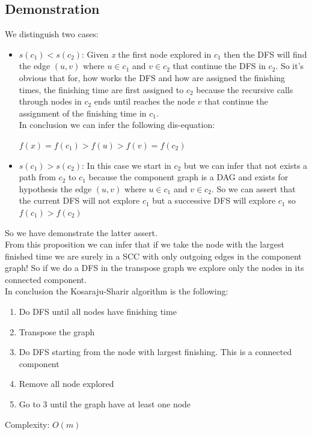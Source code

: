 \documentclass[10pt,a4paper]{book}
\begin{document}
			\subsection{Demonstration}
			We distinguish two cases:
			\begin{itemize}
				\item $ s(c_1) < s(c_2) $: Given \textit{x} the first node explored in $ c_1  $ then the DFS will find the edge $ (u,v) $ where $ u \in c_1 $ and $ v \in c_2 $ that continue the DFS in $ c_2 $. So it's obvious that for, how works the DFS and how are assigned the finishing times, the finishing time are first assigned to $ c_2 $ because the recursive calls through nodes in $ c_2 $ ends until reaches the node $ v $ that continue the assignment of the finishing time in $ c_1 $.\\
				In conclusion we can infer the following dis-equation:
				\begin{center}
				$ f(x) = f(c_1) > f(u) > f(v)  = f(c_2) $
				\end{center}
				\item $ s(c_1) > s(c_2) $: In this case we start in $ c_2 $ but we can infer that not exists a path  from $c_2$ to $ c_1 $ because the component graph is a DAG and exists for hypothesis the edge $ (u,v) $ where $ u \in c_1 $ and $ v \in c_2 $. So we can assert that the current DFS will not explore $ c_1 $ but a successive DFS will explore $ c_1 $ so $ f(c_1) > f(c_2) $
			\end{itemize}
			So we have demonstrate the latter assert.\\
		 From this proposition we can infer that if we take the node with the largest finished time we are surely in a SCC with only outgoing edges in the component graph! So if we do a DFS in the transpose graph we explore only the nodes in its connected component.\\
		 In conclusion the Kosaraju-Sharir algorithm is the following:
		 \begin{enumerate}
			 	\item Do DFS until all nodes have finishing time
			 	\item Transpose the graph
			 	\item Do DFS starting from the node with largest finishing. This is a connected component
			 	\item Remove all node explored
			 	\item Go to 3 until the graph have at least one node
		 \end{enumerate}
		 	Complexity: $ O(m) $
\end{document}
